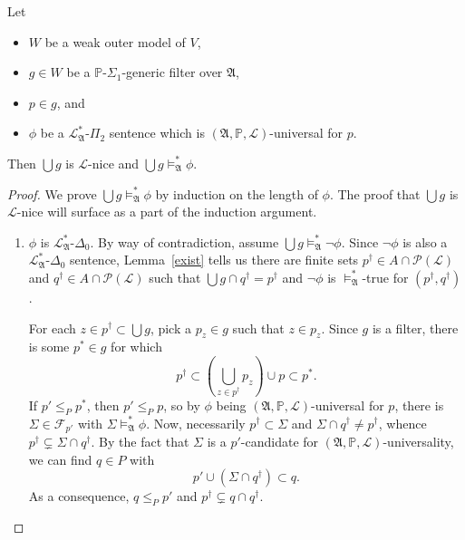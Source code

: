 \documentclass[12pt]{article}
\numberwithin{equation}{section}
\begin{document}
\begin{thm}\label{uni}
Let 
\begin{itemize} 
    \item $W$ be a weak outer model of $V$,
    \item $g \in W$ be a $\mathbb{P}$-$\Sigma_1$-generic filter over $\mathfrak{A}$,
    \item $p \in g$, and
    \item $\phi$ be a $\mathcal{L}^{*}_{\mathfrak{A}}$-$\Pi_2$ sentence which is $(\mathfrak{A}, \mathbb{P}, \mathcal{L})$-universal for $p$.
\end{itemize} 
Then $\bigcup g$ is $\mathcal{L}$-nice and $\bigcup g \models^{*}_{\mathfrak{A}} \phi$.
\end{thm}
\begin{proof}
We prove $\bigcup g \models^{*}_{\mathfrak{A}} \phi$ by induction on the length of $\phi$. The proof that $\bigcup g$ is $\mathcal{L}$-nice will surface as a part of the induction argument.
\begin{enumerate}[label=Case \arabic*:, leftmargin=50pt]
    \item $\phi$ is $\mathcal{L}^{*}_{\mathfrak{A}}$-$\Delta_0$. By way of contradiction, assume $\bigcup g \models^{*}_{\mathfrak{A}} \neg \phi$. Since $\neg \phi$ is also a $\mathcal{L}^{*}_{\mathfrak{A}}$-$\Delta_0$ sentence, Lemma~\ref{exist} tells us there are finite sets $p^{\dagger} \in A \cap \mathcal{P}(\mathcal{L})$ and $q^{\dagger} \in A \cap \mathcal{P}(\mathcal{L})$ such that $\bigcup g \cap q^{\dagger} = p^{\dagger}$ and $\neg \phi$ is $\models^{*}_{\mathfrak{A}}$-true for $(p^{\dagger}, q^{\dagger})$.

    For each $z \in p^{\dagger} \subset \bigcup g$, pick a $p_z \in g$ such that $z \in p_z$. Since $g$ is a filter, there is some $p^* \in g$ for which $$p^{\dagger} \subset (\bigcup_{z \in p^{\dagger}} p_z) \cup p \subset p^*.$$ If $p' \leq_{P} p^*$, then $p' \leq_{P} p$, so by $\phi$ being $(\mathfrak{A}, \mathbb{P}, \mathcal{L})$-universal for $p$, there is $\Sigma \in \mathcal{F}_{p'}$ with $\Sigma \models^*_{\mathfrak{A}} \phi$. Now, necessarily $p^{\dagger} \subset \Sigma$ and $\Sigma \cap q^{\dagger} \neq p^{\dagger}$, whence $p^{\dagger} \subsetneq \Sigma \cap q^{\dagger}$. By the fact that $\Sigma$ is a $p'$-candidate for $(\mathfrak{A}, \mathbb{P}, \mathcal{L})$-universality, we can find $q \in P$ with $$p' \cup (\Sigma \cap q^{\dagger}) \subset q.$$ As a consequence, $q \leq_P p'$ and $p^{\dagger} \subsetneq q \cap q^{\dagger}$.
    

\end{enumerate}
\end{proof}
\end{document}
